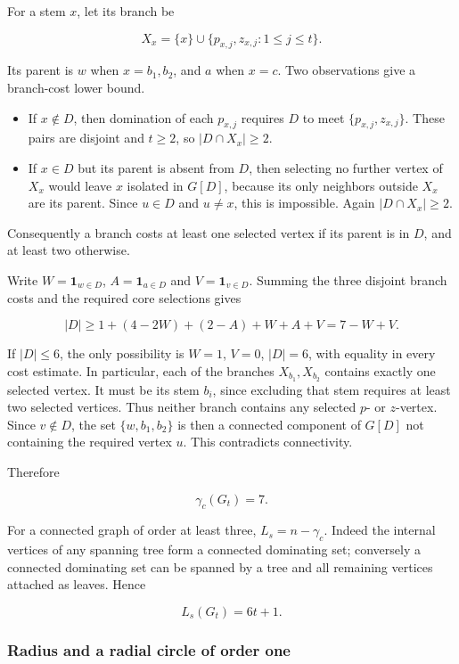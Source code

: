 \documentclass[11pt,a4paper]{article}
\theoremstyle{definition}\newtheorem{definition}[theorem]{Definition}
\theoremstyle{remark}\newtheorem{remark}[theorem]{Remark}
\begin{document}
For a stem \(x\), let its branch be

\[X_x=\{x\}\cup\{p_{x,j},z_{x,j}:1\leq j\leq t\}.\]

Its parent is \(w\) when \(x=b_1,b_2\), and \(a\) when \(x=c\). Two
observations give a branch-cost lower bound.

\begin{itemize}

\item
  If \(x\notin D\), then domination of each \(p_{x,j}\) requires \(D\)
  to meet \(\{p_{x,j},z_{x,j}\}\). These pairs are disjoint and
  \(t\geq2\), so \(|D\cap X_x|\geq2\).
\item
  If \(x\in D\) but its parent is absent from \(D\), then selecting no
  further vertex of \(X_x\) would leave \(x\) isolated in \(G[D]\),
  because its only neighbors outside \(X_x\) are its parent. Since
  \(u\in D\) and \(u\ne x\), this is impossible. Again
  \(|D\cap X_x|\geq2\).
\end{itemize}

Consequently a branch costs at least one selected vertex if its parent
is in \(D\), and at least two otherwise.

Write \(W=\mathbf1_{w\in D}\), \(A=\mathbf1_{a\in D}\) and
\(V=\mathbf1_{v\in D}\). Summing the three disjoint branch costs and the
required core selections gives

\[|D|\geq1+(4-2W)+(2-A)+W+A+V=7-W+V.\]

If \(|D|\leq6\), the only possibility is \(W=1\), \(V=0\), \(|D|=6\),
with equality in every cost estimate. In particular, each of the
branches \(X_{b_1},X_{b_2}\) contains exactly one selected vertex. It
must be its stem \(b_i\), since excluding that stem requires at least
two selected vertices. Thus neither branch contains any selected \(p\)-
or \(z\)-vertex. Since \(v\notin D\), the set \(\{w,b_1,b_2\}\) is then
a connected component of \(G[D]\) not containing the required vertex
\(u\). This contradicts connectivity.

Therefore

\[\boxed{\gamma_c(G_t)=7.}\]

For a connected graph of order at least three, \(L_s=n-\gamma_c\).
Indeed the internal vertices of any spanning tree form a connected
dominating set; conversely a connected dominating set can be spanned by
a tree and all remaining vertices attached as leaves. Hence

\[\boxed{L_s(G_t)=6t+1.}\]

\subsubsection{Radius and a radial circle of order
one}\label{late:154:radius-and-a-radial-circle-of-order-one}
\end{document}
